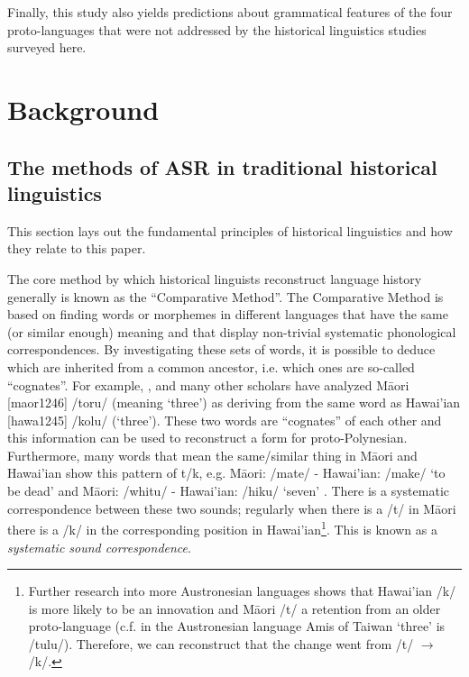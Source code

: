 \documentclass[12pt,letterpaper]{article}
\begin{document}
Finally, this study also yields predictions about grammatical features of the four proto-languages that were not addressed by the historical linguistics studies surveyed here.


\FloatBarrier
\section{Background}
\label{recon_grammar}

\subsection{The methods of ASR in traditional historical linguistics}
\label{sec:ars:metod:hist}
This section lays out the fundamental principles of historical linguistics and how they relate to this paper.

The core method by which historical linguists reconstruct language history generally is known as the ``Comparative Method''. The Comparative Method is based on finding words or morphemes in different languages that have the same (or similar enough) meaning and that display non-trivial systematic phonological correspondences. By investigating these sets of words, it is possible to deduce which are inherited from a common ancestor, i.e. which ones are so-called ``cognates''. For example, \citet{blust2004}, \citet{greenhill2011pollex} and many other scholars have analyzed M\={a}ori [maor1246] /toru/ (meaning `three') as deriving from the same word as Hawai'ian [hawa1245] /kolu/ (`three'). These two words are ``cognates'' of each other and this information can be used to reconstruct a form for proto-Polynesian. Furthermore, many words that mean the same/similar thing in M\={a}ori and Hawai'ian show this pattern of t/k, e.g. M\={a}ori: /mate/ - Hawai'ian: /make/ `to be dead' and M\={a}ori: /whitu/ - Hawai'ian: /hiku/ `seven' \citep{ABVD}. There is a systematic correspondence between these two sounds; regularly when there is a /t/ in M\={a}ori there is a /k/ in the corresponding position in Hawai'ian\footnote{Further research into more Austronesian languages shows that Hawai'ian /k/ is more likely to be an innovation and M\={a}ori /t/ a retention from an older proto-language (c.f. in the Austronesian language Amis of Taiwan `three' is /tulu/). Therefore, we can reconstruct that the change went from /t/ $\rightarrow$ /k/.}. This is known as a \emph{systematic sound correspondence}. 
\end{document}
